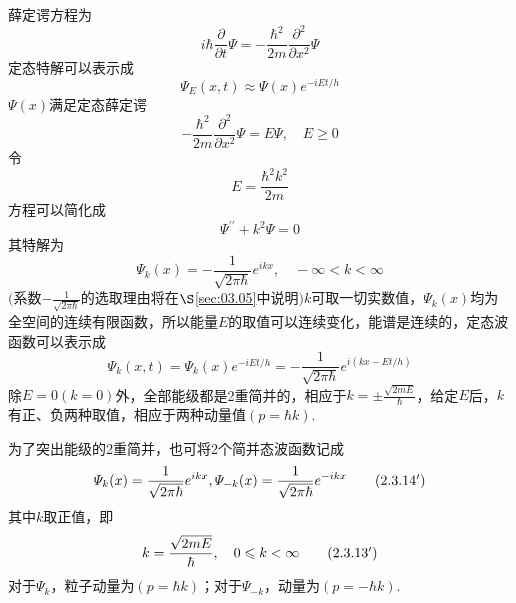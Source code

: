 \solution 薛定谔方程为
\begin{equation*}
	i\hbar\frac{\partial}{\partial t}\varPsi
	=-\frac{\hbar^{2}}{2m}\frac{\partial^{2}}{\partial x^{2}}\varPsi
\end{equation*}
定态特解可以表示成
\begin{equation*}
	\varPsi_{E}(x,t)\approx \varPsi(x)e^{-iEt/h}
\end{equation*}
$\varPsi(x)$满足定态薛定谔
\begin{equation*}
	-\frac{\hbar^{2}}{2m}\frac{\partial^{2}}{\partial x^{2}}\varPsi=E\varPsi,\quad E\geqslant0
\end{equation*}
令
\begin{equation}\label{eq23.13}
	E=\frac{\hbar^{2}k^{2}}{2m}
\end{equation}
方程可以简化成
\begin{equation*}
	\varPsi^{\prime\prime}+k^{2}\varPsi=0
\end{equation*}\eqnormal
其特解为
\begin{equation}\label{eq23.14}
	\varPsi_{k}(x)=-\frac{1}{\sqrt{2\pi\hbar}}e^{ikx},\quad -\infty<k<\infty
\end{equation}\eqlong
$\bigg($系数$-\frac{1}{\sqrt{2\pi\hbar}}$的选取理由将在$\S$\ref{sec:03.05}中说明$\bigg)$$k$可取一切实数值，$\varPsi_{k}(x)$均为全空间的连续有限函数，所以能量$E$的取值可以连续变化，能谱是连续的，定态波函数可以表示成
\begin{equation}\label{eq23.15}
	\varPsi_{k}(x,t)=\varPsi_{k}(x)e^{-iEt/h}=-\frac{1}{\sqrt{2\pi\hbar}}e^{i(kx-Et/h)}
\end{equation}
除$E=0(k=0)$外，全部能级都是2重简并的，相应于$k=\pm\frac{\sqrt{2mE}}{\hbar}$，给定$E$后，$k$有正、负两种取值，相应于两种动量值$(p=\hbar k)$.

为了突出能级的2重简并，也可将2个简并态波函数记成
\begin{equation*}\label{eq23.14'}
	\varPsi_{k}(x)=\frac{1}{\sqrt{2\pi\hbar}}e^{ikx},\varPsi_{-k}(x)=\frac{1}{\sqrt{2\pi\hbar}}e^{-ikx} \tag{$2.3.14^{\prime}$}
\end{equation*}\eqnormal
其中$k$取正值，即
\begin{equation*}\label{eq23.13'}
	k=\frac{\sqrt{2mE}}{\hbar},\quad 0\leqslant k <\infty \tag{$2.3.13^{\prime}$}
\end{equation*}\eqlong
对于$\varPsi_{k}$，粒子动量为$(p=\hbar k)$；对于$\varPsi_{-k}$，动量为$(p=-\hbar k)$.

